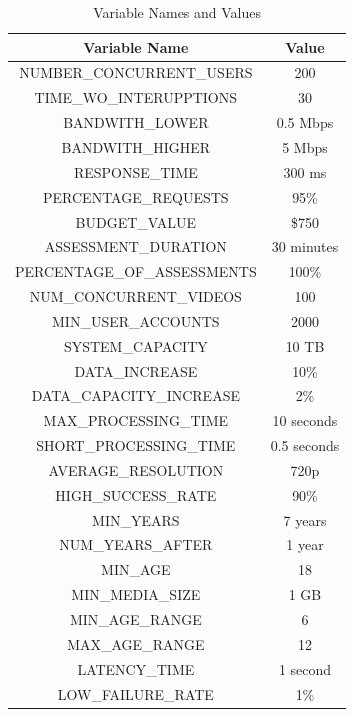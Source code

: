 \documentclass[12pt]{article}
\begin{document}
\begin{table}[H]
  \centering
  \caption{Variable Names and Values}
  \label{tab:variables}
  \begin{tabular}{|c|c|}
      \hline
      \textbf{Variable Name} & \textbf{Value} \\
      \hline
      NUMBER\_CONCURRENT\_USERS & 200 \\
      \hline
      TIME\_WO\_INTERUPPTIONS & 30 \\
      \hline
      BANDWITH\_LOWER & 0.5 Mbps \\
      \hline
      BANDWITH\_HIGHER & 5 Mbps \\
      \hline
      RESPONSE\_TIME & 300 ms \\
      \hline
      PERCENTAGE\_REQUESTS & 95\% \\
      \hline
      BUDGET\_VALUE & \$750 \\
      \hline
      ASSESSMENT\_DURATION & 30 minutes \\
      \hline
      PERCENTAGE\_OF\_ASSESSMENTS & 100\% \\
      \hline
      NUM\_CONCURRENT\_VIDEOS & 100 \\
      \hline
      MIN\_USER\_ACCOUNTS & 2000 \\
      \hline
      SYSTEM\_CAPACITY & 10 TB \\
      \hline
      DATA\_INCREASE & 10\% \\
      \hline
      DATA\_CAPACITY\_INCREASE & 2\% \\
      \hline
      MAX\_PROCESSING\_TIME & 10 seconds \\
      \hline
      SHORT\_PROCESSING\_TIME & 0.5 seconds \\
      \hline
      AVERAGE\_RESOLUTION & 720p \\
      \hline
      HIGH\_SUCCESS\_RATE & 90\% \\
      \hline
      MIN\_YEARS & 7 years \\
      \hline
      NUM\_YEARS\_AFTER & 1 year \\
      \hline
      MIN\_AGE & 18 \\
      \hline
      MIN\_MEDIA\_SIZE & 1 GB \\
      \hline
      MIN\_AGE\_RANGE & 6 \\
      \hline
      MAX\_AGE\_RANGE & 12 \\
      \hline
      LATENCY\_TIME & 1 second \\
      \hline
      LOW\_FAILURE\_RATE & 1\% \\

\end{tabular}
\end{table}
\end{document}
